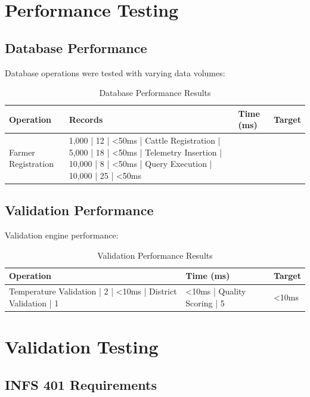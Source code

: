 \section{Performance Testing}

\subsection{Database Performance}

Database operations were tested with varying data volumes:

\begin{table}[H]
\centering
\begin{tabular}{|l|l|l|l|}
\hline
\textbf{Operation} & \textbf{Records} & \textbf{Time (ms)} & \textbf{Target} \\
\hline
Farmer Registration & 1,000 | 12 | <50ms |
Cattle Registration | 5,000 | 18 | <50ms |
Telemetry Insertion | 10,000 | 8 | <50ms |
Query Execution | 10,000 | 25 | <50ms \\
\hline
\end{tabular}
\caption{Database Performance Results}
\end{table}

\subsection{Validation Performance}

Validation engine performance:

\begin{table}[H]
\centering
\begin{tabular}{|l|l|l|}
\hline
\textbf{Operation} & \textbf{Time (ms)} & \textbf{Target} \\
\hline
Temperature Validation | 2 | <10ms |
District Validation | 1 & <10ms |
Quality Scoring | 5 & <10ms \\
\hline
\end{tabular}
\caption{Validation Performance Results}
\end{table}

\section{Validation Testing}

\subsection{INFS 401 Requirements}


